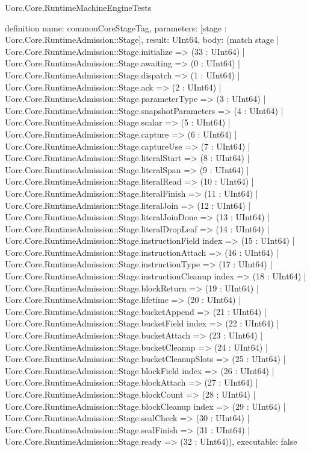 \begin{lexlean}{Uorc.Core.RuntimeMachineEngineTests}
\begin{semanticmodule}
definition{
  name: commonCoreStageTag,
  parameters: [stage : Uorc.Core.RuntimeAdmission::Stage],
  result: UInt64,
  body: (match stage
    | Uorc.Core.RuntimeAdmission::Stage.initialize => (33 : UInt64)
    | Uorc.Core.RuntimeAdmission::Stage.awaiting => (0 : UInt64)
    | Uorc.Core.RuntimeAdmission::Stage.dispatch => (1 : UInt64)
    | Uorc.Core.RuntimeAdmission::Stage.ack => (2 : UInt64)
    | Uorc.Core.RuntimeAdmission::Stage.parameterType => (3 : UInt64)
    | Uorc.Core.RuntimeAdmission::Stage.snapshotParameters => (4 : UInt64)
    | Uorc.Core.RuntimeAdmission::Stage.scalar => (5 : UInt64)
    | Uorc.Core.RuntimeAdmission::Stage.capture => (6 : UInt64)
    | Uorc.Core.RuntimeAdmission::Stage.captureUse => (7 : UInt64)
    | Uorc.Core.RuntimeAdmission::Stage.literalStart => (8 : UInt64)
    | Uorc.Core.RuntimeAdmission::Stage.literalSpan => (9 : UInt64)
    | Uorc.Core.RuntimeAdmission::Stage.literalRead => (10 : UInt64)
    | Uorc.Core.RuntimeAdmission::Stage.literalFinish => (11 : UInt64)
    | Uorc.Core.RuntimeAdmission::Stage.literalJoin => (12 : UInt64)
    | Uorc.Core.RuntimeAdmission::Stage.literalJoinDone => (13 : UInt64)
    | Uorc.Core.RuntimeAdmission::Stage.literalDropLeaf => (14 : UInt64)
    | Uorc.Core.RuntimeAdmission::Stage.instructionField index => (15 : UInt64)
    | Uorc.Core.RuntimeAdmission::Stage.instructionAttach => (16 : UInt64)
    | Uorc.Core.RuntimeAdmission::Stage.instructionType => (17 : UInt64)
    | Uorc.Core.RuntimeAdmission::Stage.instructionCleanup index => (18 : UInt64)
    | Uorc.Core.RuntimeAdmission::Stage.blockReturn => (19 : UInt64)
    | Uorc.Core.RuntimeAdmission::Stage.lifetime => (20 : UInt64)
    | Uorc.Core.RuntimeAdmission::Stage.bucketAppend => (21 : UInt64)
    | Uorc.Core.RuntimeAdmission::Stage.bucketField index => (22 : UInt64)
    | Uorc.Core.RuntimeAdmission::Stage.bucketAttach => (23 : UInt64)
    | Uorc.Core.RuntimeAdmission::Stage.bucketCleanup => (24 : UInt64)
    | Uorc.Core.RuntimeAdmission::Stage.bucketCleanupSlots => (25 : UInt64)
    | Uorc.Core.RuntimeAdmission::Stage.blockField index => (26 : UInt64)
    | Uorc.Core.RuntimeAdmission::Stage.blockAttach => (27 : UInt64)
    | Uorc.Core.RuntimeAdmission::Stage.blockCount => (28 : UInt64)
    | Uorc.Core.RuntimeAdmission::Stage.blockCleanup index => (29 : UInt64)
    | Uorc.Core.RuntimeAdmission::Stage.sealCheck => (30 : UInt64)
    | Uorc.Core.RuntimeAdmission::Stage.sealFinish => (31 : UInt64)
    | Uorc.Core.RuntimeAdmission::Stage.ready => (32 : UInt64)),
  executable: false
}


\end{semanticmodule}
\end{lexlean}
